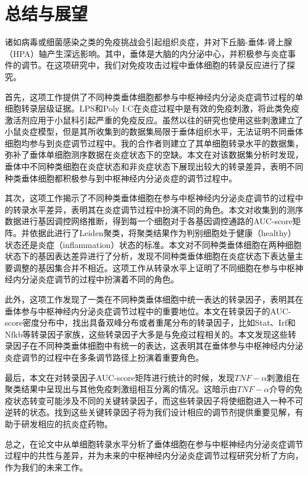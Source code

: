 
\chapter{总结与展望}
  诸如病毒或细菌感染之类的免疫挑战会引起组织炎症，并对下丘脑­-垂体­-肾上腺（HPA）轴产生深远影响。其中，垂体是大脑的内分泌中心，并积极参与炎症事件的调节。在这项研究中，我们对免疫攻击过程中垂体细胞的转录反应进行了探究。

  首先，这项工作提供了不同种类垂体细胞都参与中枢神经内分泌炎症调节过程的单细胞转录层级证据。LPS和Poly I:C在炎症过程中是有效的免疫刺激，将此类免疫激活剂应用于小鼠科引起严重的免疫反应。虽然以往的研究也使用这些刺激建立了小鼠炎症模型，但是其所收集到的数据集局限于垂体组织水平，无法证明不同垂体细胞均参与到炎症调节过程中。我的合作者则建立了其单细胞转录水平的数据集，弥补了垂体单细胞测序数据在炎症状态下的空缺。本文在对该数据集分析时发现，垂体中不同种类细胞在炎症状态和非炎症状态下展现出较大的转录差异，表明不同种类垂体细胞都积极参与到中枢神经内分泌炎症的调节过程中。

  其次，这项工作揭示了不同种类垂体细胞在参与中枢神经内分泌炎症调节的过程中的转录水平差异，表明其在炎症调节过程中扮演不同的角色。本文对收集到的测序数据进行基因调控网络推断，得到每一个细胞对于各基因调控通路的AUC-score矩阵。并依据此进行了Leiden聚类，将聚类结果作为判别细胞处于健康（healthy）状态还是炎症（inflammation）状态的标准。本文对不同种类垂体细胞在两种细胞状态下的基因表达差异进行了分析，发现不同种类垂体细胞在炎症状态下表达量主要调整的基因集合并不相近。这项工作从转录水平上证明了不同细胞在参与中枢神经内分泌炎症调节的过程中扮演着不同的角色。

  此外，这项工作发现了一类在不同种类垂体细胞中统一表达的转录因子，表明其在垂体参与中枢神经内分泌炎症调节过程中的重要地位。本文在转录因子的AUC-score密度分布中，找出具备双峰分布或者重尾分布的转录因子，比如Stat、Irf和Nfkb等转录因子家族，这些转录因子大多是与免疫过程相关的。本文发现这些转录因子在不同种类垂体细胞中有统一的表达，这表明其在垂体参与中枢神经内分泌炎症调节的过程中在多条调节路径上扮演着重要角色。

  最后，本文在对转录因子AUC-score矩阵进行统计的时候，发现$TNF-\alpha$刺激组在聚类结果中呈现出与其他免疫刺激组相互分离的情况。这暗示由$TNF-\alpha$介导的免疫状态转变可能涉及不同的关键转录因子，而这些转录因子将使细胞进入一种不可逆转的状态。找到这些关键转录因子将为我们设计相应的调节剂提供重要见解，有助于研发相应的抗炎症药物。

  总之，在论文中从单细胞转录水平分析了垂体细胞在参与中枢神经内分泌炎症调节过程中的共性与差异，并为未来的中枢神经内分泌炎症调节过程研究分析了方向，作为我们的未来工作。

